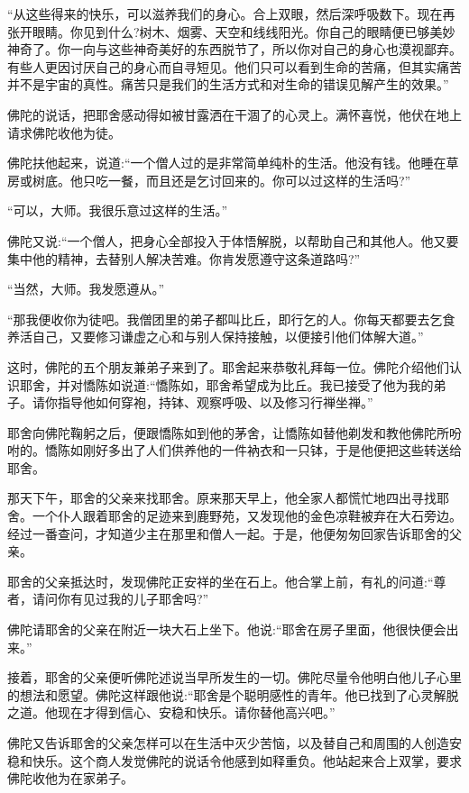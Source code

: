\documentclass[12pt,twoside,openany]{book}
\begin{document}
“从这些得来的快乐，可以滋养我们的身心。合上双眼，然后深呼吸数下。现在再张开眼睛。你见到什么?树木、烟雾、天空和线线阳光。你自己的眼睛便已够美妙神奇了。你一向与这些神奇美好的东西脱节了，所以你对自己的身心也漠视鄙弃。有些人更因讨厌自己的身心而自寻短见。他们只可以看到生命的苦痛，但其实痛苦并不是宇宙的真性。痛苦只是我们的生活方式和对生命的错误见解产生的效果。”

佛陀的说话，把耶舍感动得如被甘露洒在干涸了的心灵上。满怀喜悦，他伏在地上请求佛陀收他为徒。

佛陀扶他起来，说道:“一个僧人过的是非常简单纯朴的生活。他没有钱。他睡在草房或树底。他只吃一餐，而且还是乞讨回来的。你可以过这样的生活吗?”

“可以，大师。我很乐意过这样的生活。”

佛陀又说:“一个僧人，把身心全部投入于体悟解脱，以帮助自己和其他人。他又要集中他的精神，去替别人解决苦难。你肯发愿遵守这条道路吗?”

“当然，大师。我发愿遵从。”

“那我便收你为徒吧。我僧团里的弟子都叫比丘，即行乞的人。你每天都要去乞食养活自己，又要修习谦虚之心和与别人保持接触，以便接引他们体解大道。”

这时，佛陀的五个朋友兼弟子来到了。耶舍起来恭敬礼拜每一位。佛陀介绍他们认识耶舍，并对憍陈如说道:“憍陈如，耶舍希望成为比丘。我已接受了他为我的弟子。请你指导他如何穿袍，持钵、观察呼吸、以及修习行禅坐禅。”

耶舍向佛陀鞠躬之后，便跟憍陈如到他的茅舍，让憍陈如替他剃发和教他佛陀所吩咐的。憍陈如刚好多出了人们供养他的一件衲衣和一只钵，于是他便把这些转送给耶舍。

那天下午，耶舍的父亲来找耶舍。原来那天早上，他全家人都慌忙地四出寻找耶舍。一个仆人跟着耶舍的足迹来到鹿野苑，又发现他的金色凉鞋被弃在大石旁边。经过一番查问，才知道少主在那里和僧人一起。于是，他便匆匆回家告诉耶舍的父亲。

耶舍的父亲抵达时，发现佛陀正安祥的坐在石上。他合掌上前，有礼的问道:“尊者，请问你有见过我的儿子耶舍吗?”

佛陀请耶舍的父亲在附近一块大石上坐下。他说:“耶舍在房子里面，他很快便会出来。”

接着，耶舍的父亲便听佛陀述说当早所发生的一切。佛陀尽量令他明白他儿子心里的想法和愿望。佛陀这样跟他说:“耶舍是个聪明感性的青年。他已找到了心灵解脱之道。他现在才得到信心、安稳和快乐。请你替他高兴吧。”

佛陀又告诉耶舍的父亲怎样可以在生活中灭少苦恼，以及替自己和周围的人创造安稳和快乐。这个商人发觉佛陀的说话令他感到如释重负。他站起来合上双掌，要求佛陀收他为在家弟子。
\end{document}
